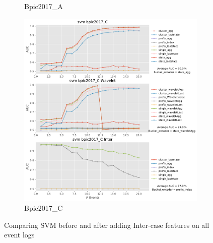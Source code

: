 \documentclass[twoside,11pt]{Latex/Classes/PhDthesisPSnPDF}
\begin{document}
\begin{figure}[!htbp]
\begin{subfigure}{0.48\textwidth}
		\caption{Bpic2017\_A} \label{fig:b17ai}
	\end{subfigure}\hspace*{\fill}
	\begin{subfigure}{0.48\textwidth}
		\includegraphics[width=\linewidth]{images/inter/svm/bpic2017_C.pdf}
		\caption{Bpic2017\_C} \label{fig:b17ci}
	\end{subfigure}	
	\caption{Comparing SVM before and after adding Inter-case features on all event logs}
\label{fig:inters1}
\end{figure}
\end{document}
